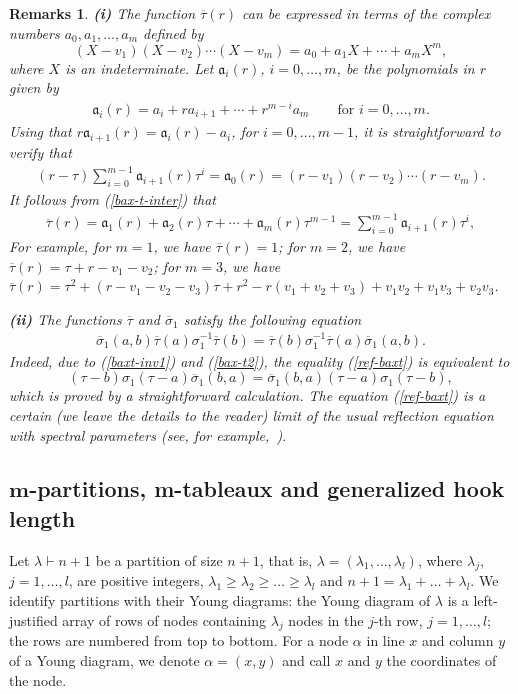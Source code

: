 \documentclass[pdftex]{sigma}
\newcommand{\bsi}{{\overline{\sigma}}}
\newcommand{\bta}{{\overline{\tau}}}
\newtheorem*{Remarks}{Remarks}
\begin{document}
\begin{Remarks} \textbf{(i)}
The function $\bta(r)$ can be expressed in terms of the complex numbers $a_0,a_1,{\dots},a_m$ def\/ined by
\[
(X-v_1)(X-v_2)\cdots(X-v_m)=a_0+a_1X+\cdots+a_{m}X^{m}  ,
\]
where $X$ is an indeterminate.
Let $\mathfrak{a}_i(r)$, $i=0,\dots,m$, be the polynomials in $r$ given by
\begin{gather}\label{polalicl}
\mathfrak{a}_i(r)=a_i+r a_{i+1}+\cdots+r^{m-i}a_m  \qquad\textrm{for \ \ $i=0,\dots,m$.}
\end{gather}
Using that $r \mathfrak{a}_{i+1}(r)=\mathfrak{a}_{i}(r)-a_i$, for $i=0,\dots,m-1$, it is straightforward to verify that
\begin{gather}
\label{bax-t-inter}
(r-\tau)\sum_{i=0}^{m-1}\mathfrak{a}_{i+1}(r)\tau^i=\mathfrak{a}_0(r)=(r-v_1)(r-v_2)\cdots(r-v_m) .
\end{gather}
It follows from (\ref{bax-t-inter}) that
\begin{gather}\label{bax-t}
\bta(r)=\mathfrak{a}_1(r)+\mathfrak{a}_2(r)\tau+\cdots+\mathfrak{a}_{m}(r)\tau^{m-1}=\sum_{i=0}^{m-1}\mathfrak{a}_{i+1}(r)\tau^i  ,
\end{gather}
For example, for $m=1$, we have $\bta(r)=1$; for $m=2$, we have $\bta(r)=\tau+r-v_1-v_2$; for $m=3$, we have $\bta(r)=\tau^2+(r-v_1-v_2-v_3)\tau+r^2-r(v_1+v_2+v_3)+v_1v_2+v_1v_3+v_2v_3 $.


\textbf{(ii)}
The functions $\bta$ and $\bsi_1$ satisfy the following equation
\begin{gather}\label{ref-baxt}
\bsi_1(a,b)\bta(a)\sigma_1^{-1}\bta(b)=\bta(b)\sigma_1^{-1}\bta(a)\bsi_1(a,b)  .
\end{gather}
Indeed, due to (\ref{baxt-inv1}) and (\ref{bax-t2}), the equality (\ref{ref-baxt}) is equivalent to
\[
(\tau-b)\sigma_1(\tau-a)\bsi_1(b,a)=\bsi_1(b,a)(\tau-a)\sigma_1(\tau-b)  ,
\]
which is proved by a straightforward calculation.
The equation (\ref{ref-baxt}) is a certain (we leave the details to the reader) limit of the usual ref\/lection equation with spectral parameters (see, for example,~\cite{K}).
\end{Remarks}

\subsection[$m$-partitions, m-tableaux and generalized hook length]{$\boldsymbol{m}$-partitions, m-tableaux and generalized hook length}


Let $\lambda\vdash n+1$ be a partition of size $n+1$, that is, $\lambda=(\lambda_1,\dots,\lambda_l)$, where $\lambda _j$, $j=1,\dots,l$,
are positive integers, $\lambda_1\geqslant\lambda_2\geqslant\dots\geqslant\lambda_l$ and $n+1=\lambda_1+\dots+\lambda_l$.
We identify partitions with their Young diagrams: the Young diagram of $\lambda$ is a left-justif\/ied array of rows of
nodes containing $\lambda_j$ nodes in the $j$-th row, $j=1,\dots,l$; the rows are numbered from top to bottom.
For a node $\alpha$ in line $x$ and column $y$ of a Young diagram, we denote $\alpha=(x,y)$ and call $x$ and $y$ the coordinates of the node.
\end{document}
